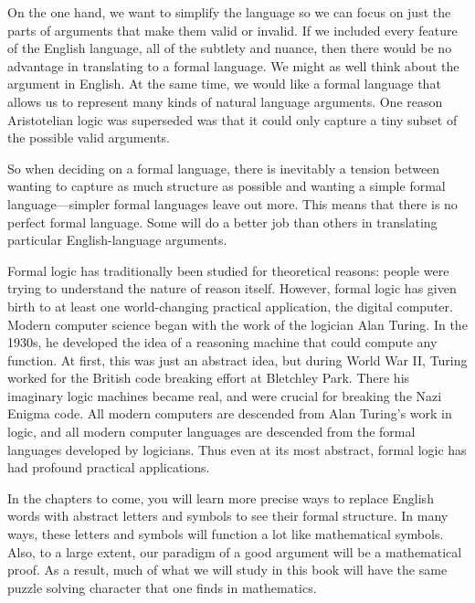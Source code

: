 
On the one hand, we want to simplify the language so we can focus on just the parts of arguments that make them valid or invalid. If we included every feature of the English language, all of the subtlety and nuance, then there would be no advantage in translating to a formal language. We might as well think about the argument in English. At the same time, we would like a formal language that allows us to represent many kinds of natural language arguments. One reason Aristotelian logic was superseded was that it could only capture a tiny subset of the possible valid arguments. 

So when deciding on a formal language, there is inevitably a tension between wanting to capture as much structure as possible and wanting a simple formal language---simpler formal languages leave out more. This means that there is no perfect formal language. Some will do a better job than others in translating particular English-language arguments.

Formal logic has traditionally been studied for theoretical reasons: people were trying to understand the nature of reason itself. However, formal logic has given birth to at least one world-changing practical application, the digital computer. Modern computer science began with the work of the logician Alan Turing. In the 1930s, he developed the idea of a reasoning machine that could compute any function. At first, this was just an abstract idea, but during World War II, Turing worked for the British code breaking effort at Bletchley Park. There his imaginary logic machines became real, and were crucial for breaking the Nazi Enigma code. All modern computers are descended from Alan Turing's work in logic, and all modern computer languages are descended from the formal languages developed by logicians. Thus even at its most abstract, formal logic has had profound practical applications.

In the chapters to come, you will learn more precise ways to replace English words with abstract letters and symbols to see their formal structure. In many ways, these letters and symbols will function a lot like mathematical symbols. Also, to a large extent, our paradigm of a good argument will be a mathematical proof. As a result, much of what we will study in this book will have the same puzzle solving character that one finds in mathematics. 


